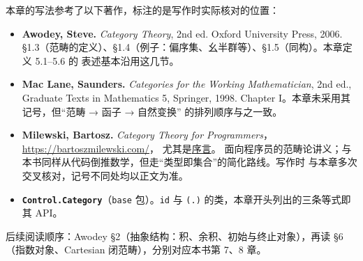 本章的写法参考了以下著作，标注的是写作时实际核对的位置：

\begin{itemize}
\tightlist
\item
  \textbf{Awodey, Steve.} \emph{Category Theory}, 2nd ed. Oxford University Press, 2006.
  §1.3（范畴的定义）、§1.4（例子：偏序集、幺半群等）、§1.5（同构）。本章定义 5.1--5.6 的
  表述基本沿用这几节。
\item
  \textbf{Mac Lane, Saunders.} \emph{Categories for the Working Mathematician}, 2nd ed., Graduate Texts
  in Mathematics 5, Springer, 1998. Chapter I。本章未采用其记号，但“范畴 → 函子 → 自然变换”
  的排列顺序与之一致。
\item
  \textbf{Milewski, Bartosz.} \emph{Category Theory for Programmers}，\url{https://bartoszmilewski.com/}，
  尤其是\href{https://bartoszmilewski.com/2014/10/28/category-theory-for-programmers-the-preface/}{序言}。
  面向程序员的范畴论讲义；与本书同样从代码倒推数学，但走“类型即集合”的简化路线。写作时
  与本章多次交叉核对，记号不同处均以正文为准。
\item
  \textbf{\passthrough{\lstinline!Control.Category!}}（\passthrough{\lstinline!base!} 包）。\passthrough{\lstinline!id!} 与 \passthrough{\lstinline!(.)!} 的类，本章开头列出的三条等式即其 API。
\end{itemize}

后续阅读顺序：Awodey §2（抽象结构：积、余积、初始与终止对象），再读 §6（指数对象、Cartesian
闭范畴），分别对应本书第 7、8 章。
